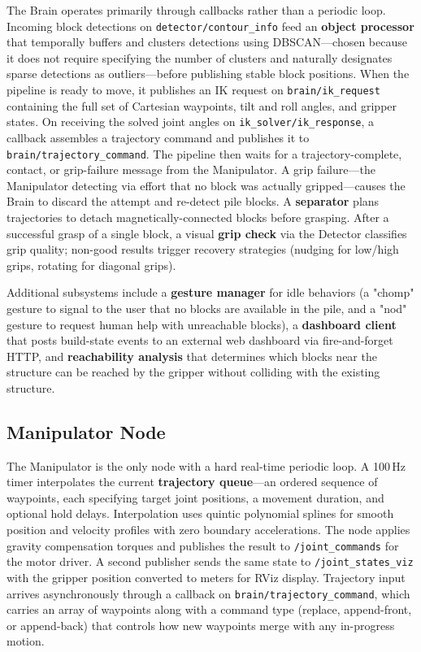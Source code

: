 \noindent The Brain operates primarily through callbacks rather than a periodic loop. Incoming block detections on \texttt{detector/contour\_info} feed an \textbf{object processor} that temporally buffers and clusters detections using DBSCAN---chosen because it does not require specifying the number of clusters and naturally designates sparse detections as outliers---before publishing stable block positions. When the pipeline is ready to move, it publishes an IK request on \texttt{brain/ik\_request} containing the full set of Cartesian waypoints, tilt and roll angles, and gripper states. On receiving the solved joint angles on \texttt{ik\_solver/ik\_response}, a callback assembles a trajectory command and publishes it to \texttt{brain/trajectory\_command}. The pipeline then waits for a trajectory-complete, contact, or grip-failure message from the Manipulator. A grip failure---the Manipulator detecting via effort that no block was actually gripped---causes the Brain to discard the attempt and re-detect pile blocks. A \textbf{separator} plans trajectories to detach magnetically-connected blocks before grasping. After a successful grasp of a single block, a visual \textbf{grip check} via the Detector classifies grip quality; non-good results trigger recovery strategies (nudging for low/high grips, rotating for diagonal grips).

\noindent Additional subsystems include a \textbf{gesture manager} for idle behaviors (a "chomp" gesture to signal to the user that no blocks are available in the pile, and a "nod" gesture to request human help with unreachable blocks), a \textbf{dashboard client} that posts build-state events to an external web dashboard via fire-and-forget HTTP, and \textbf{reachability analysis} that determines which blocks near the structure can be reached by the gripper without colliding with the existing structure.



\subsection{Manipulator Node}

\noindent The Manipulator is the only node with a hard real-time periodic loop. A 100\,Hz timer interpolates the current \textbf{trajectory queue}---an ordered sequence of waypoints, each specifying target joint positions, a movement duration, and optional hold delays. Interpolation uses quintic polynomial splines for smooth position and velocity profiles with zero boundary accelerations. The node applies gravity compensation torques and publishes the result to \texttt{/joint\_commands} for the motor driver. A second publisher sends the same state to \texttt{/joint\_states\_viz} with the gripper position converted to meters for RViz display. Trajectory input arrives asynchronously through a callback on \texttt{brain/trajectory\_command}, which carries an array of waypoints along with a command type (replace, append-front, or append-back) that controls how new waypoints merge with any in-progress motion.

